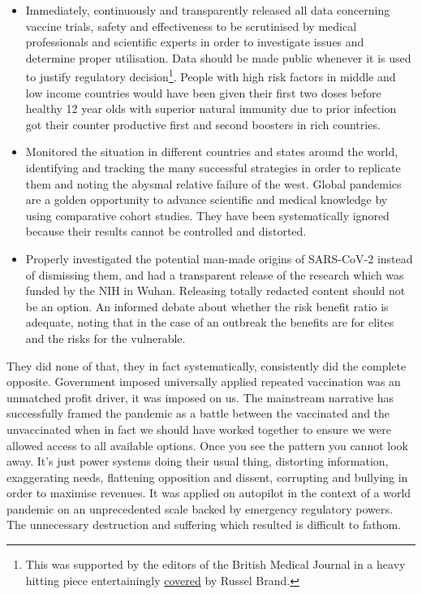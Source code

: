 \documentclass[11pt,a4paper,notitlepage]{report}
\begin{document}
\begin{itemize}
  \item Immediately, continuously and transparently released all data concerning vaccine trials, safety and effectiveness to be scrutinised by medical professionals and scientific experts in order to investigate issues and determine proper utilisation. Data should be made public whenever it is used to justify regulatory decision\footnote{This was supported by the editors of the British Medical Journal \cite{bmj19012022} in a heavy hitting piece entertainingly \href{https://www.youtube.com/watch?v=sqD_JYAs7pU}{covered} by Russel Brand.}. People with high risk factors in middle and low income countries would have been given their first two doses before healthy 12 year olds with superior natural immunity due to prior infection got their counter productive first and second boosters in rich countries.
  \item Monitored the situation in different countries and states around the world, identifying and tracking the many successful strategies in order to replicate them and noting the abysmal relative failure of the west. Global pandemics are a golden opportunity to advance scientific and medical knowledge by using comparative cohort studies. They have been systematically ignored because their results cannot be controlled and distorted.
  \item Properly investigated the potential man-made origins of SARS-CoV-2 instead of dismissing them, and had a transparent release of the research which was funded by the NIH in Wuhan. Releasing totally redacted content should not be an option. An informed debate about whether the risk benefit ratio is adequate, noting that in the case of an outbreak the benefits are for elites and the risks for the vulnerable. 
\end{itemize}


They did none of that, they in fact systematically, consistently did the complete opposite. Government imposed universally applied repeated vaccination was an unmatched profit driver, it was imposed on us. The mainstream narrative has successfully framed the pandemic as a battle between the vaccinated and the unvaccinated when in fact we should have worked together to ensure we were allowed access to all available options. Once you see the pattern you cannot look away. It's just power systems doing their usual thing, distorting information, exaggerating needs, flattening opposition and dissent, corrupting and bullying in order to maximise revenues. It was applied on autopilot in the context of a world pandemic on an unprecedented scale backed by emergency regulatory powers. The unnecessary destruction and suffering which resulted is difficult to fathom. 
\end{document}
